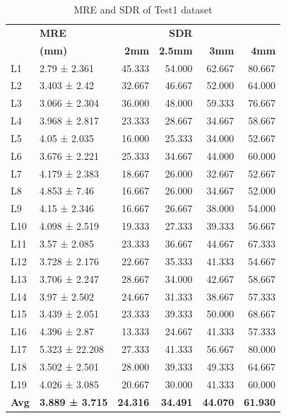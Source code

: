 \documentclass[sn-mathphys]{sn-jnl}%
\theoremstyle{thmstyleone}%
\theoremstyle{thmstyletwo}%
\theoremstyle{thmstylethree}%
\begin{document}
 
 




\begin{table}[ht!]
\centering
\begin{tabular}{llrrrr}
\toprule
&                \textbf{MRE}         &            &  \textbf{SDR} &\\
    &             \textbf{(mm)}&       \textbf{2mm} &       \textbf{2.5mm} &       \textbf{3mm}&       \textbf{4mm} \\
\midrule
 
  L1 &    2.79 ± 2.361 &  45.333 &  54.000 &  62.667 &  80.667 \\
  L2 &    3.403 ± 2.42 &  32.667 &  46.667 &  52.000 &  64.000 \\
  L3 &   3.066 ± 2.304 &  36.000 &  48.000 &  59.333 &  76.667 \\
  L4 &   3.968 ± 2.817 &  23.333 &  28.667 &  34.667 &  58.667 \\
  L5 &    4.05 ± 2.035 &  16.000 &  25.333 &  34.000 &  52.667 \\
  L6 &   3.676 ± 2.221 &  25.333 &  34.667 &  44.000 &  60.000 \\
  L7 &   4.179 ± 2.383 &  18.667 &  26.000 &  32.667 &  52.667 \\
  L8 &    4.853 ± 7.46 &  16.667 &  26.000 &  34.667 &  52.000 \\
  L9 &    4.15 ± 2.346 &  16.667 &  26.667 &  38.000 &  54.000 \\
 L10 &   4.098 ± 2.519 &  19.333 &  27.333 &  39.333 &  56.667 \\
 L11 &    3.57 ± 2.085 &  23.333 &  36.667 &  44.667 &  67.333 \\
 L12 &   3.728 ± 2.176 &  22.667 &  35.333 &  41.333 &  54.667 \\
 L13 &   3.706 ± 2.247 &  28.667 &  34.000 &  42.667 &  58.667 \\
 L14 &    3.97 ± 2.502 &  24.667 &  31.333 &  38.667 &  57.333 \\
 L15 &   3.439 ± 2.051 &  23.333 &  39.333 &  50.000 &  68.667 \\
 L16 &    4.396 ± 2.87 &  13.333 &  24.667 &  41.333 &  57.333 \\
 L17 &  5.323 ± 22.208 &  27.333 &  41.333 &  56.667 &  80.000 \\
 L18 &   3.502 ± 2.501 &  28.000 &  39.333 &  49.333 &  64.667 \\
 L19 &   4.026 ± 3.085 &  20.667 &  30.000 &  41.333 &  60.000 \\
 \textbf{Avg} &   \textbf{3.889 ± 3.715 }&  \textbf{24.316} &  \textbf{34.491} &  \textbf{44.070} &  \textbf{61.930} \\
\bottomrule
\end{tabular}
\caption{MRE and SDR of Test1 dataset}
\label{table:6.1}
\end{table}
\end{document}
